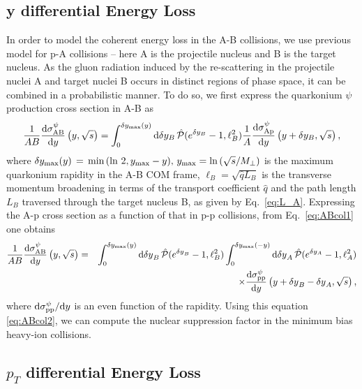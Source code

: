 \documentclass[11pt,onecolumn]{article}
\newcommand{\dd}{{\rm d}}
\newcommand{\beq}{\begin{equation}}
\newcommand{\eeq}{\end{equation}}
\newcommand{\bqa}{\begin{eqnarray}}
\newcommand{\eqa}{\end{eqnarray}}
\begin{document}
\subsection{y differential Energy Loss}
In order to model the coherent energy loss in the A-B collisions, we use previous model for p-A collisions -- here A is the projectile nucleus and B is the target nucleus. As the gluon radiation induced by the re-scattering in the projectile nuclei A and target nuclei B occurs in distinct regions of phase space, it can be combined in a probabilistic manner. To do so, we first express the quarkonium $\psi$ production cross section in A-B as %
%
\beq
\frac{1}{A B}\frac{\dd\sigma_{\mathrm{AB}}^{\psi}}{\dd y}\left(y, \sqrt{s} \right)  = \int_0^{\delta y_{\rm max}(y)} \dd \delta y_B \,\hat{\cal P}(e^{\delta y_B} - 1, \ell_B^2) \frac{1}{A} \frac{\dd\sigma_{\mathrm{Ap}}^{\psi}}{\dd y} \left( y + \delta y_B, \sqrt{s}\right) ,
\label{eq:ABcol1}
\eeq
%
where $\delta y_{\rm max}(y) \, = \, \text{min} \, (\ln \, 2,y_{\rm max}-y), \, y_{\rm max} = \ln \, (\sqrt{s}/M_\perp) $ is the maximum quarkonium rapidity in the A-B COM frame, $\ell_B = \sqrt{\hat{q} L_B}$ is the transverse momentum broadening in terms of the transport coefficient $\hat{q}$ and the path length $L_B$ traversed through the target nucleus B, as given by Eq.~\eqref{eq:L_A}. Expressing the A-p cross section as a function of that in p-p collisions, from Eq.~\eqref{eq:ABcol1} one obtains
%
\bqa
\frac{1}{A B}\frac{\dd\sigma_{\mathrm{AB}}^{\psi}}{\dd y}\left(y, \sqrt{s} \right)  &=& \int_0^{\delta y_{\rm max}(y)} \dd {\delta y}_B \,\hat{\cal P}(e^{{\delta y}_B} - 1, \ell_B^2) \int_0^{\delta y_{\rm max}(- y)} \dd {\delta y}_A \,\hat{\cal P}(e^{\delta y_A} - 1, \ell_A^2) \nonumber \\ 
&& \quad \quad \times \frac{\dd\sigma_{\mathrm{pp}}^{\psi}}{\dd y} \left( y + {\delta y}_B  - {\delta y}_A , \sqrt{s}\right)  ,
\label{eq:ABcol2}
\eqa
%
where $\dd\sigma_{\mathrm{pp}}^{\psi}/\dd y$ is an even function of the rapidity. Using this equation \eqref{eq:ABcol2}, we can compute the nuclear suppression factor in the minimum bias heavy-ion collisions.

\subsection{$p_T$ differential Energy Loss}
\end{document}

